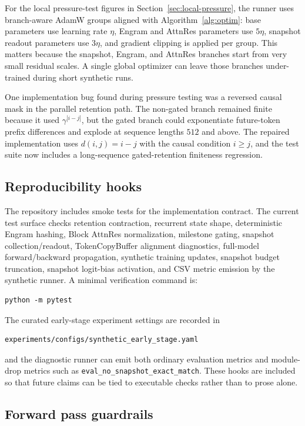 \documentclass[preprint,12pt]{elsarticle}
\begin{document}
For the local pressure-test figures in Section~\ref{sec:local-pressure}, the runner uses branch-aware AdamW groups aligned with Algorithm~\ref{alg:optim}: base parameters use learning rate $\eta$, Engram and AttnRes parameters use $5\eta$, snapshot readout parameters use $3\eta$, and gradient clipping is applied per group. This matters because the snapshot, Engram, and AttnRes branches start from very small residual scales. A single global optimizer can leave those branches under-trained during short synthetic runs.

One implementation bug found during pressure testing was a reversed causal mask in the parallel retention path. The non-gated branch remained finite because it used $\gamma^{|i-j|}$, but the gated branch could exponentiate future-token prefix differences and explode at sequence lengths $512$ and above. The repaired implementation uses $d(i,j)=i-j$ with the causal condition $i\geq j$, and the test suite now includes a long-sequence gated-retention finiteness regression.

\subsection{Reproducibility hooks}

The repository includes smoke tests for the implementation contract. The current test surface checks retention contraction, recurrent state shape, deterministic Engram hashing, Block AttnRes normalization, milestone gating, snapshot collection/readout, TokenCopyBuffer alignment diagnostics, full-model forward/backward propagation, synthetic training updates, snapshot budget truncation, snapshot logit-bias activation, and CSV metric emission by the synthetic runner. A minimal verification command is:
\begin{verbatim}
python -m pytest
\end{verbatim}
The curated early-stage experiment settings are recorded in
\begin{verbatim}
experiments/configs/synthetic_early_stage.yaml
\end{verbatim}
and the diagnostic runner can emit both ordinary evaluation metrics and module-drop metrics such as \texttt{eval\_no\_snapshot\_exact\_match}. These hooks are included so that future claims can be tied to executable checks rather than to prose alone.

\subsection{Forward pass guardrails}
\end{document}
